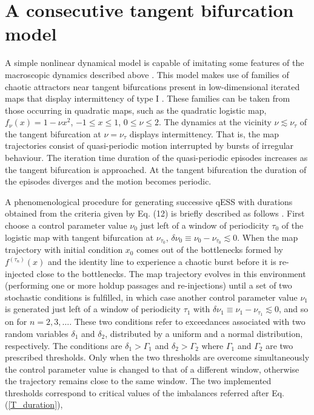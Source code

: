 \documentclass[12pt]{article}
\begin{document}
\section{A consecutive tangent bifurcation model}

A simple nonlinear dynamical model is capable of imitating some features of the macroscopic dynamics described above \cite{ADR_HJJ_DP_AR1}. This model makes use of families of chaotic attractors near tangent bifurcations present in low-dimensional iterated maps that display intermittency of type I \cite{schuster1}. These families can be taken from those occurring in quadratic maps, such as the quadratic logistic map,  $f_{\nu }(x)=1-\nu x^{2}$, $-1\leq x\leq 1$, $0\leq \nu \leq 2$. The dynamics at the vicinity $\nu \lesssim \nu _\tau$ of the tangent bifurcation at $\nu =\nu _\tau$ displays intermittency. That is, the map trajectories consist of quasi-periodic motion interrupted by bursts of irregular behaviour. The iteration time duration of the quasi-periodic episodes increases as the tangent bifurcation is approached. At the tangent bifurcation the duration of the episodes diverges and the motion becomes periodic.


A phenomenological procedure for generating successive qESS with durations obtained from the criteria given by Eq. (12) is briefly described as follows \cite{ADR_HJJ_DP_AR1}. First choose a control parameter value $\nu _{0}$ just
left of a window of periodicity $\tau_{0}$ of the logistic map with tangent
bifurcation at $\nu _{\tau_{0}}$, $\delta \nu _{0}\equiv \nu _{0}-\nu
_{\tau_{0}}\lesssim 0$. When the map trajectory with initial condition $x_{0}$
comes out of the bottlenecks formed by $f^{(\tau_{n})}(x)$ and the identity
line to experience a chaotic burst before it is re-injected close to the bottlenecks. The map trajectory evolves in this environment (performing one or more holdup passages and re-injections) until a set of two stochastic conditions is fulfilled, in which case another control parameter value $\nu_1$ is generated just left of a window of periodicity 
$\tau_{1}$ with $\delta \nu _{1}\equiv \nu _{1}-\nu _{\tau_{1}}\lesssim 0$, and so
on for $n=2,3,\ldots $.  These two conditions refer to exceedances associated with two random variables $\delta_1$ and $\delta_2$, distributed by a uniform and a normal distribution, respectively. The conditions are  $\delta_1>\Gamma_1$ and $\delta_2>\Gamma_2$ where  $\Gamma_1$ and $\Gamma_2$ are two prescribed thresholds. Only when the two thresholds are overcome simultaneously the control parameter value is changed to that of a different window, otherwise the trajectory remains close to the same window. The two implemented thresholds correspond to critical values of the imbalances referred after Eq. (\ref{T_duration}),
\end{document}
